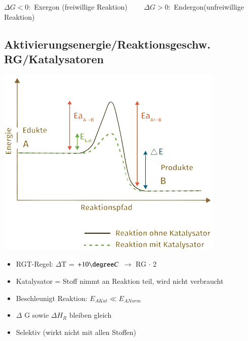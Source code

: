     $\Delta G < 0:$ Exergon (freiwillige Reaktion) $\qquad \Delta G > 0:$ Endergon(unfreiwillige Reaktion)


\subsection{Aktivierungsenergie/Reaktionsgeschw. RG/Katalysatoren}\label{Reaktionsgeschw}
\begin{minipage}{0.32\linewidth}
    \includegraphics[width=\linewidth]{pictures/Katalysator_1.png}
\end{minipage}
\hfill
\begin{minipage}{0.65\linewidth}
    \begin{itemize}
        \item RGT-Regel: $\Delta$T = $+10\degree C$ $\rightarrow$ RG $\cdot$ 2
        \item Katalysator = Stoff nimmt an Reaktion teil, wird nicht verbraucht 
        \item Beschleunigt Reaktion: $E_{AKat} \ll E_{ANorm}$
        \item $\Delta$ G sowie $\Delta H_R$ bleiben gleich
        \item Selektiv (wirkt nicht mit allen Stoffen)
    \end{itemize}
\end{minipage}
